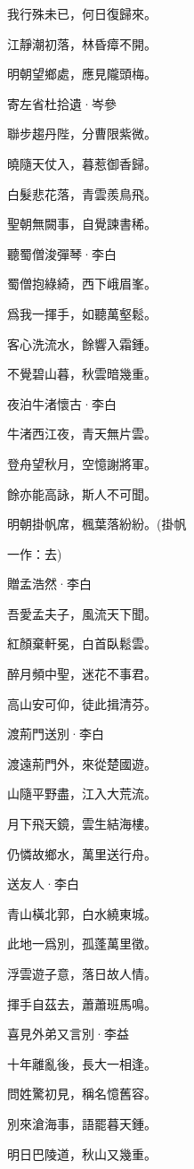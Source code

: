 \documentclass[12pt,a4paper]{ctexbook}
\begin{document}
我行殊未已，何日復歸來。\par
江靜潮初落，林昏瘴不開。\par
明朝望鄉處，應見隴頭梅。\par
寄左省杜拾遺·岑參\par
聯步趨丹陛，分曹限紫微。\par
曉隨天仗入，暮惹御香歸。\par
白髮悲花落，青雲羨鳥飛。\par
聖朝無闕事，自覺諫書稀。\par
聽蜀僧浚彈琴·李白\par
蜀僧抱綠綺，西下峨眉峯。\par
爲我一揮手，如聽萬壑鬆。\par
客心洗流水，餘響入霜鍾。\par
不覺碧山暮，秋雲暗幾重。\par
夜泊牛渚懷古·李白\par
牛渚西江夜，青天無片雲。\par
登舟望秋月，空憶謝將軍。\par
餘亦能高詠，斯人不可聞。\par
明朝掛帆席，楓葉落紛紛。(掛帆\par
一作：去)\par
贈孟浩然·李白\par
吾愛孟夫子，風流天下聞。\par
紅顏棄軒冕，白首臥鬆雲。\par
醉月頻中聖，迷花不事君。\par
高山安可仰，徒此揖清芬。\par
渡荊門送別·李白\par
渡遠荊門外，來從楚國遊。\par
山隨平野盡，江入大荒流。\par
月下飛天鏡，雲生結海樓。\par
仍憐故鄉水，萬里送行舟。\par
送友人·李白\par
青山橫北郭，白水繞東城。\par
此地一爲別，孤蓬萬里徵。\par
浮雲遊子意，落日故人情。\par
揮手自茲去，蕭蕭班馬鳴。\par
喜見外弟又言別·李益\par
十年離亂後，長大一相逢。\par
問姓驚初見，稱名憶舊容。\par
別來滄海事，語罷暮天鍾。\par
明日巴陵道，秋山又幾重。\par
\end{document}
